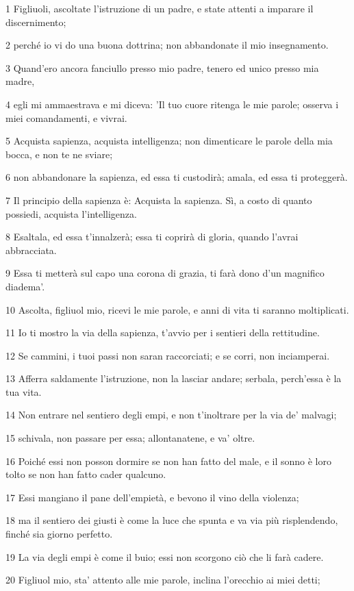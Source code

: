 \par 1 Figliuoli, ascoltate l'istruzione di un padre, e state attenti a imparare il discernimento;
\par 2 perché io vi do una buona dottrina; non abbandonate il mio insegnamento.
\par 3 Quand'ero ancora fanciullo presso mio padre, tenero ed unico presso mia madre,
\par 4 egli mi ammaestrava e mi diceva: 'Il tuo cuore ritenga le mie parole; osserva i miei comandamenti, e vivrai.
\par 5 Acquista sapienza, acquista intelligenza; non dimenticare le parole della mia bocca, e non te ne sviare;
\par 6 non abbandonare la sapienza, ed essa ti custodirà; amala, ed essa ti proteggerà.
\par 7 Il principio della sapienza è: Acquista la sapienza. Sì, a costo di quanto possiedi, acquista l'intelligenza.
\par 8 Esaltala, ed essa t'innalzerà; essa ti coprirà di gloria, quando l'avrai abbracciata.
\par 9 Essa ti metterà sul capo una corona di grazia, ti farà dono d'un magnifico diadema'.
\par 10 Ascolta, figliuol mio, ricevi le mie parole, e anni di vita ti saranno moltiplicati.
\par 11 Io ti mostro la via della sapienza, t'avvio per i sentieri della rettitudine.
\par 12 Se cammini, i tuoi passi non saran raccorciati; e se corri, non inciamperai.
\par 13 Afferra saldamente l'istruzione, non la lasciar andare; serbala, perch'essa è la tua vita.
\par 14 Non entrare nel sentiero degli empi, e non t'inoltrare per la via de' malvagi;
\par 15 schivala, non passare per essa; allontanatene, e va' oltre.
\par 16 Poiché essi non posson dormire se non han fatto del male, e il sonno è loro tolto se non han fatto cader qualcuno.
\par 17 Essi mangiano il pane dell'empietà, e bevono il vino della violenza;
\par 18 ma il sentiero dei giusti è come la luce che spunta e va via più risplendendo, finché sia giorno perfetto.
\par 19 La via degli empi è come il buio; essi non scorgono ciò che li farà cadere.
\par 20 Figliuol mio, sta' attento alle mie parole, inclina l'orecchio ai miei detti;
